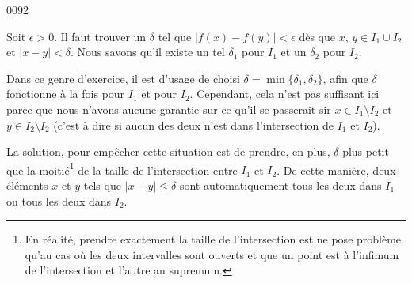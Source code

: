 
\begin{corrige}{0092}

Soit $\epsilon>0$. Il faut trouver un $\delta$ tel que $| f(x)-f(y) |<\epsilon$ dès que $x$, $y\in I_1\cup I_2$ et $| x-y |<\delta$. Nous savons qu'il existe un tel $\delta_1$ pour $I_1$ et un $\delta_2$ pour $I_2$.

Dans ce genre d'exercice, il est d'usage de choisi $\delta=\min\{ \delta_1,\delta_2 \}$, afin que $\delta$ fonctionne à la fois pour $I_1$ et pour $I_2$. Cependant, cela n'est pas suffisant ici parce que nous n'avons aucune garantie sur ce qu'il se passerait sir $x\in I_1\setminus I_2$ et $y\in I_2\setminus I_2$ (c'est à dire si aucun des deux n'est dans l'intersection de $I_1$ et $I_2$).

La solution, pour empêcher cette situation est de prendre, en plus, $\delta$ plus petit que la moitié\footnote{En réalité, prendre exactement la taille de l'intersection est ne pose problème qu'au cas où les deux intervalles sont ouverts et que un point est à l'infimum de l'intersection et l'autre au supremum.} de la taille de l'intersection entre $I_1$ et $I_2$. De cette manière, deux éléments $x$ et $y$ tels que $| x-y |\leq\delta$ sont automatiquement tous les deux dans $I_1$ ou tous les deux dans $I_2$.

\end{corrige}
